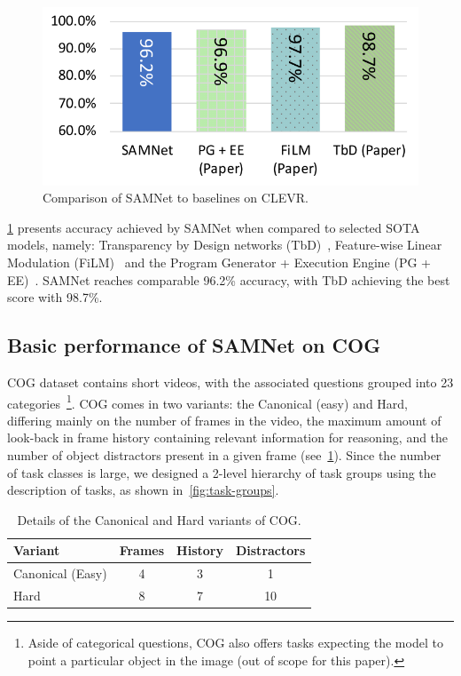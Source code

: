 \begin{figure}[htbp]
	\centering
	\includegraphics[width=0.8\columnwidth]{../img/plots/clevr_baselines.pdf}
	\caption{Comparison of SAMNet to baselines on CLEVR.}
	\label{fig:clevr_baselines}
\end{figure}

\cref{fig:clevr_baselines} presents accuracy achieved by SAMNet when compared to selected SOTA models, namely: Transparency by Design networks (TbD)~\cite{mascharka2018transparency}, Feature-wise Linear Modulation (FiLM)~\cite{perez2018film} and the Program Generator + Execution Engine (PG + EE)~\cite{johnson2017inferring}.
SAMNet reaches comparable 96.2\% accuracy, with TbD achieving the best score with 98.7\%.


\subsection{Basic performance of SAMNet on COG}
\label{sec:cog-baseline-compare}

COG dataset contains short videos, with the associated questions grouped into 23 categories~\footnote{Aside of categorical questions, COG also offers tasks expecting the model to point a particular object in the image (out of scope for this paper).}.
COG comes in two variants: the Canonical (easy) and Hard, differing mainly on the number of frames in the video, the maximum amount of look-back in frame history containing relevant information for reasoning, and the number of object distractors present in a given frame (see~\cref{tab:cog_variants}).
Since the number of task classes is large, we designed a 2-level hierarchy of task groups using the
description of tasks, as shown in~\cref{fig:task-groups}.

\begin{table}[ht]
	\centering
	\begin{tabular}{lccc}
		\toprule
		Variant	& Frames & History	& Distractors \\
		\midrule
		Canonical (Easy) & 4 & 3 & 1\\
		Hard  & 8 & 7 & 10\\
		\bottomrule
	\end{tabular}
	\caption{Details of the Canonical and Hard variants of COG.}
	\label{tab:cog_variants}
\end{table}


